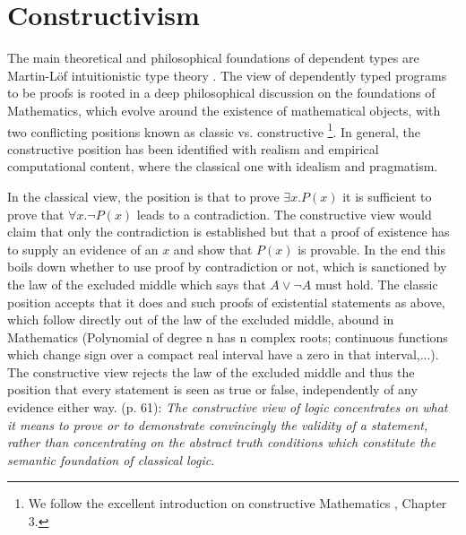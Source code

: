 
\section{Constructivism}
The main theoretical and philosophical foundations of dependent types are Martin-L\"of intuitionistic type theory \cite{martin-lof_intuitionistic_1972}. The view of dependently typed programs to be proofs is rooted in a deep philosophical discussion on the foundations of Mathematics, which evolve around the existence of mathematical objects, with two conflicting positions known as classic vs. constructive \footnote{We follow the excellent introduction on constructive Mathematics \cite{thompson_type_1991}, Chapter 3.}. In general, the constructive position has been identified with realism and empirical computational content, where the classical one with idealism and pragmatism.

In the classical view, the position is that to prove $\exists x. P(x)$ it is sufficient to prove that $\forall x. \neg P(x)$ leads to a contradiction. The constructive view would claim that only the contradiction is established but that a proof of existence has to supply an evidence of an $x$ and show that $P(x)$ is provable. In the end this boils down whether to use proof by contradiction or not, which is sanctioned by the law of the excluded middle which says that $A \lor \neg A$ must hold. The classic position accepts that it does and such proofs of existential statements as above, which follow directly out of the law of the excluded middle, abound in Mathematics (Polynomial of degree n has n complex roots; continuous functions which change sign over a compact real interval have a zero in that interval,...). The constructive view rejects the law of the excluded middle and thus the position that every statement is seen as true or false, independently of any evidence either way. \cite{thompson_type_1991} (p. 61): \textit{The constructive view of logic concentrates on what it means to prove or to demonstrate convincingly the validity of a statement, rather than concentrating on the abstract truth conditions which constitute the semantic foundation of classical logic}.

